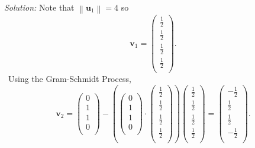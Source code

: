 \documentclass{article}
\begin{document}
\newline
\newline\textit{Solution:} Note that $\left\| {{\mathbf{u}}_{1}} \right\|=4$ so \[\mathbf{v}_1=\left( \begin{matrix}
   \frac{1}{2}  \\
   \frac{1}{2}  \\
   \frac{1}{2}  \\
   \frac{1}{2}  \\
\end{matrix} \right).\] \ Using the Gram-Schmidt Process, \[{{\mathbf{v}}_{2}}=\left( \begin{matrix}
  0 \\ 
  1 \\ 
  1 \\ 
  0 \\ 
\end{matrix} \right)-\left( \left( \begin{matrix}
  0 \\ 
  1 \\ 
  1 \\ 
  0 \\ 
\end{matrix} \right)\cdot \left( \begin{matrix}
   \frac{1}{2}  \\
   \frac{1}{2}  \\
   \frac{1}{2}  \\
   \frac{1}{2}  \\
\end{matrix} \right) \right)\left( \begin{matrix}
   \frac{1}{2}  \\
   \frac{1}{2}  \\
   \frac{1}{2}  \\
   \frac{1}{2}  \\
\end{matrix} \right)=\left( \begin{matrix}
   -\frac{1}{2}  \\
   \frac{1}{2}  \\
   \frac{1}{2}  \\
   -\frac{1}{2}  \\
\end{matrix} \right).\]
\end{document}
